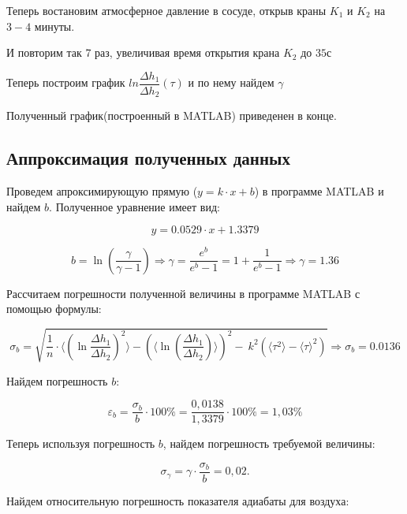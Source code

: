 \documentclass[a4paper,11.5pt]{article} %
\begin{document}
Теперь востановим атмосферное давление в сосуде, открыв краны $K_1$ и $K_2$ на $3-4$ минуты.

И повторим так 7 раз, увеличивая время открытия крана $K_2$ до $35 \text{с}$

Теперь построим график $ln\dfrac{\Delta h_1}{\Delta h_2}(\tau)$ и по нему найдем $\gamma$

Полученный график(построенный в MATLAB) приведенен в конце.


\subsection{Аппроксимация полученных данных}

Проведем апроксимирующую прямую ($y = k\cdot x + b$) в программе MATLAB и найдем $b$. Полученное уравнение имеет вид:

\begin{equation}
	y = 0.0529\cdot x + 1.3379
\end{equation}

\begin{equation}
	b = \ln \left(\dfrac{\gamma}{\gamma - 1}\right) \Rightarrow \gamma = \frac{e^b}{e^b - 1} = 1 + \frac{1}{e^b - 1} \Rightarrow \gamma = 1.36
\end{equation}

Рассчитаем погрешности полученной величины в программе MATLAB с помощью формулы:

\begin{equation}
	\sigma_b =\sqrt{\dfrac{1}{n} \cdot \langle\left(\ln \dfrac{\Delta h_1}{\Delta h_2}		\right)^2\rangle - \left(\langle\ln \left(\dfrac{\Delta h_1}{\Delta h_2}\right)\rangle\right)^2 - \ k^2(\langle\tau^2\rangle - \langle\tau\rangle^2)} \Rightarrow \sigma_b = 0.0136
\end{equation} 

Найдем погрешность $b$:

\begin{equation}
	\varepsilon_{b} = \dfrac{\sigma_{b}}{b}\cdot 100 \% = \dfrac{0,0138}{1,3379}\cdot 100 \% =  1,03 \% 
\end{equation} 

Теперь используя погрешность $b$, найдем погрешность требуемой величины:

\begin{equation}
	\sigma_{\gamma} = \gamma \cdot \dfrac{\sigma_{b}}{b}  =  0,02.
\end{equation} 

Найдем относительную погрешность показателя адиабаты для воздуха:
\end{document}
